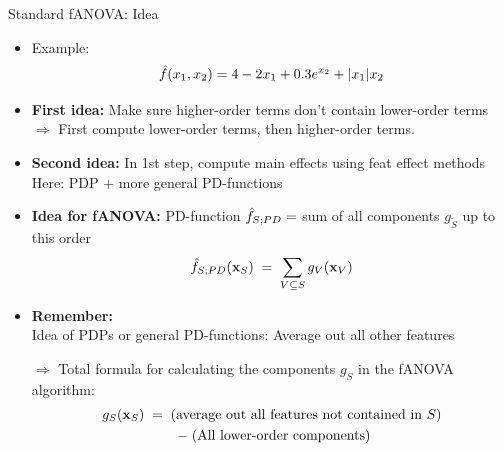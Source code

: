 \documentclass[10pt,compress,t,notes=noshow, xcolor=table]{beamer}
\begin{document}
\begin{frame}{Standard fANOVA: Idea}

    \begin{itemize}
        \item Example:
        \begin{equation*}
            \hat{f}(x_1, x_2) = 4 - 2x_1 + 0.3 e^{x_2} + |x_1|x_2
        \end{equation*}
        \pause
        \item \textbf{First idea:} Make sure higher-order terms don't contain lower-order terms \\
        \(\Rightarrow\) First compute lower-order terms, then higher-order terms. \\
        \pause
        \item \textbf{Second idea:} In 1st step, compute main effects using feat effect methods \\
        Here: PDP + more general PD-functions
        \pause
        \item \textbf{Idea for fANOVA:} PD-function $\hat{f}_{S;PD} =$ sum of all components $g_{\tilde{S}}$ up to this order
        $$
        \hat{f}_{S;PD}(\mathbf{x}_S) \; = \; \sum_{V \subseteq S} g_{V}(\mathbf{x}_V)
        $$
        \pause
        \item \textbf{Remember:} \\ Idea of PDPs or general PD-functions: Average out all other features
        \item[$\Rightarrow$] Total formula for calculating the components \(g_S\) in the fANOVA algorithm:
        \begin{multline*}
            g_{S} (\mathbf{x}_S)
            \;=\; (\text{average out all features not contained in } S) \\
            \;-\; (\text{All lower-order components})
        \end{multline*}
    \end{itemize}

    
    
\end{frame}
\end{document}
